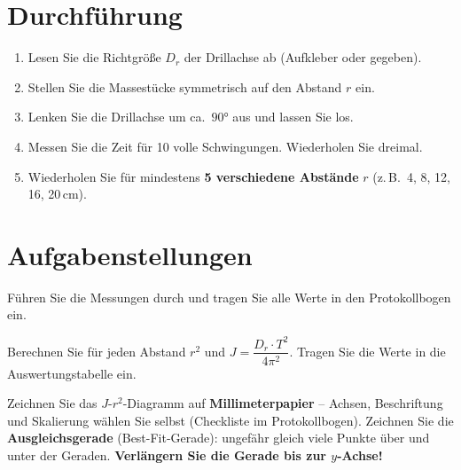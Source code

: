 \documentclass[11pt,a4paper]{scrartcl}
\begin{document}
\section*{Durchführung}

\begin{enumerate}
	\item Lesen Sie die Richtgröße $D_r$ der Drillachse ab (Aufkleber oder gegeben).
	\item Stellen Sie die Massestücke symmetrisch auf den Abstand $r$ ein.
	\item Lenken Sie die Drillachse um ca.\ $90°$ aus und lassen Sie los.
	\item Messen Sie die Zeit für 10 volle Schwingungen. Wiederholen Sie dreimal.
	\item Wiederholen Sie für mindestens \textbf{5 verschiedene Abstände} $r$ (z.\,B.\ 4, 8, 12, 16, 20\,cm).
\end{enumerate}

\section*{Aufgabenstellungen}

\begin{aufgabe}[title={\faIcon{pencil-alt} Aufgabe 1: Messungen durchführen}]
	Führen Sie die Messungen durch und tragen Sie alle Werte in den Protokollbogen ein.
\end{aufgabe}

\begin{aufgabe}[title={\faIcon{pencil-alt} Aufgabe 2: Auswertungstabelle}]
	Berechnen Sie für jeden Abstand $r^2$ und $J = \dfrac{D_r \cdot T^2}{4\pi^2}$. Tragen Sie die Werte in die Auswertungstabelle ein.
\end{aufgabe}

\begin{aufgabe}[title={\faIcon{pencil-alt} Aufgabe 3: $J$-$r^2$-Diagramm}]
	Zeichnen Sie das $J$-$r^2$-Diagramm auf \textbf{Millimeterpapier} -- Achsen, Beschriftung und Skalierung wählen Sie selbst (Checkliste im Protokollbogen). Zeichnen Sie die \textbf{Ausgleichsgerade} (Best-Fit-Gerade): ungefähr gleich viele Punkte über und unter der Geraden. \textbf{Verlängern Sie die Gerade bis zur $y$-Achse!}
\end{aufgabe}
\end{document}
